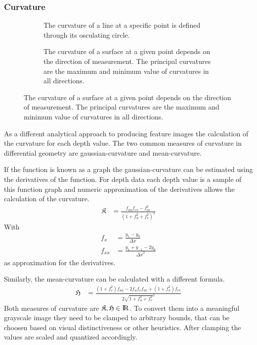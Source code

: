\subsubsection{Curvature}

\begin{figure}[H]
    \begin{subfigure}[t]{0.47\textwidth}
        \scalebox{0.9}{%
        
        }
        \caption{The curvature of a line at a specific point is defined through its osculating circle.}
    \end{subfigure}
    \begin{subfigure}[t]{0.47\textwidth}
        \scalebox{0.9}{%
        
        }
        \caption{The curvature of a surface at a given point depends on the direction of measurement. The principal curvatures are the maximum and minimum value of curvatures in all directions.}
    \end{subfigure}
\end{figure}

As a different analytical approach to producing feature images the calculation of the \gls{curvature} for each depth value.
The two common measures of curvature in differential geometry are \gls{gaussian-curvature} and \gls{mean-curvature}\cite{Kuhnel2008}.

If the function is known as a graph the \Gls{gaussian-curvature} can be estimated using the derivatives of the function.
For depth data each depth value is a sample of this function graph and numeric approximation of the derivatives allows the calculation of the curvature.
\begin{align}
    \mathfrak{K} &= \frac{f_{uu} f_{vv} - f_{uv}^2}{{(1 + f_u^2 + f_v^2)}^2}
\end{align}
With
\begin{align*}
    f_{x} &= \frac{y_1 - y_0}{\Delta x} \\
    f_{xx} &= \frac{y_1 + y_{-1} - 2 y_0}{{\Delta x}^2}
\end{align*}
as approximation for the derivatives.

Similarly, the \Gls{mean-curvature} can be calculated with a different formula.
\begin{align}
    \mathfrak{H} &= \frac{{(1 + f_{v}^2)} f_{uu} - 2 f_u f_v f_{uv} + {(1 + f_u^2)} f_{vv}}{2 \sqrt{1 + f_u^2 + f_v^2}^3}
\end{align}
Both measures of curvature are $\mathfrak{K},\mathfrak{H} \in {\rm I\!R}$.
To convert them into a meaningful grayscale image they need to be clamped to arbitrary bounds, that can be choosen based on visual distinctiveness or other heuristics.
After clamping the values are scaled and quantized accordingly.
